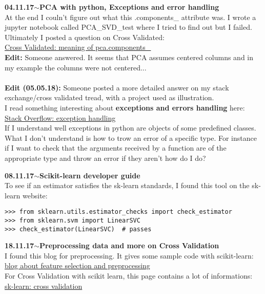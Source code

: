 \documentclass[11pt,a4paper]{article}
\newenvironment{loggentry}[2]%
{\noindent\textbf{#1}\hspace{1cm}$\mathbf{\sim}$\text{ }\textbf{#2}\\}{\vspace{0.5cm}}
\begin{document}
\begin{loggentry}{04.11.17}{PCA with python, Exceptions and error handling}
At the end I couln't figure out what this .components\_ attribute was. I wrote a jupyter notebook called PCA\_SVD\_test where I tried to find out but I failed. Ultimately I posted a question on Cross Validated:\\
\href{https://stats.stackexchange.com/questions/311908/what-is-pca-components-in-sk-learn}{Cross Validated: meaning of pca.components\_}\\
\textbf{Edit:} Someone answered. It seems that PCA assumes centered columns and in my example the columns were not centered...\\\\
\textbf{Edit (05.05.18):} Someone posted a more detailed answer on my stack exchange/cross validated tread, with a project used as illustration.\\
I read something interesting about \textbf{exceptions and errors handling} here:\\
\href{https://stackoverflow.com/questions/13484740/what-are-exceptions-in-python}{Stack Overflow: exception handling}\\
If I understand well exceptions in python are objects of some predefined classes. What I don't understand is how to trow an error of a specific type. For instance if I want to check that the arguments received by a function are of the appropriate type and throw an error if they aren't how do I do?
\end{loggentry}

\begin{loggentry}{08.11.17}{Scikit-learn developer guide}
To see if an estimator satisfies the sk-learn standards, I found this tool on the sk-learn website:
\begin{verbatim}
>>> from sklearn.utils.estimator_checks import check_estimator
>>> from sklearn.svm import LinearSVC
>>> check_estimator(LinearSVC)  # passes
\end{verbatim}
\end{loggentry}

\begin{loggentry}{18.11.17}{Preprocessing data and more on Cross Validation}
 I found this blog for preprocessing. It gives some sample code with scikit-learn:\\
\href{http://blog.datadive.net/selecting-good-features-part-i-univariate-selection/}{blog about feature selection and preprocessing}\\
For Cross Validation with scikit learn, this page contains a lot of informations:\\
\href{http://scikit-learn.org/stable/modules/grid_search.html#grid-search}{sk-learn: cross validation}\\
\end{loggentry}
\end{document}
